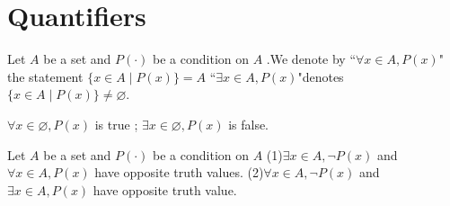 \section{Quantifiers}
\begin{definitionenv}\label{2.4.1}
    Let $A$ be a set and $P(\cdot)$ be a condition on $A$ .We denote by 
    \newline
    ``$\forall x\in A,  P(x)$" the statement $\{x\in A\mid P(x)\}=A$
    \newline
    ``$\exists x\in A, P(x)$"denotes$\{x\in A\mid P(x)\}\not= \varnothing$.
\end{definitionenv}
\begin{exampleenv}
    $\forall x\in \varnothing , P(x)$ is true ; $\exists x\in \varnothing, P(x)$ is false.
\end{exampleenv}
\begin{theoremenv}\label{theorem2.4.1}
    Let $A$ be a set and $P(\cdot)$ be a condition on $A$
    \newline
    (1)$\exists x\in A, \neg P(x) $ and $ \forall x\in A, P(x)$ have opposite truth values.
    \newline
    (2)$\forall x\in A, \neg P(x)$ and $\exists x\in A, P(x)$ have opposite truth value.
\end{theoremenv}



